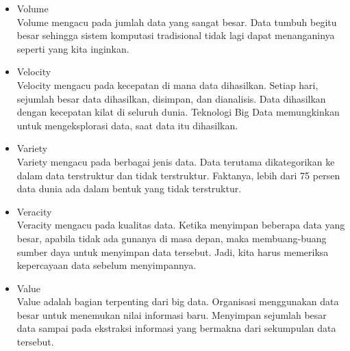\begin{itemize}
\item Volume\\
Volume mengacu pada jumlah data yang sangat besar. Data tumbuh begitu besar sehingga sistem komputasi tradisional tidak lagi dapat menanganinya seperti yang kita inginkan.

\item Velocity\\
Velocity mengacu pada kecepatan di mana data dihasilkan. Setiap hari, sejumlah besar data dihasilkan, disimpan, dan dianalisis. Data dihasilkan dengan kecepatan kilat di seluruh dunia. Teknologi Big Data memungkinkan untuk mengeksplorasi data, saat data itu dihasilkan.

\item Variety\\
Variety mengacu pada berbagai jenis data. Data terutama dikategorikan ke dalam data terstruktur dan tidak terstruktur. Faktanya, lebih dari 75 persen data dunia ada dalam bentuk yang tidak terstruktur. 

\item Veracity\\
Veracity mengacu pada kualitas data. Ketika menyimpan beberapa data yang besar, apabila tidak ada gunanya di masa depan, maka membuang-buang sumber daya untuk menyimpan data tersebut. Jadi, kita harus memeriksa kepercayaan data sebelum menyimpannya. 

\item Value\\
Value adalah bagian terpenting dari big data. Organisasi menggunakan data besar untuk menemukan nilai informasi baru. Menyimpan sejumlah besar data sampai pada ekstraksi informasi yang bermakna dari sekumpulan data tersebut.
\end{itemize}

